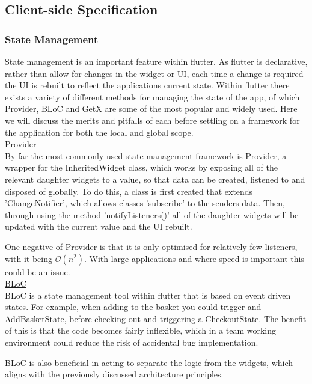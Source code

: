 \documentclass[12pt]{article}
\begin{document}
	

	
	\subsection{Client-side Specification}


	
	\subsubsection{State Management}
	State management is an important feature within flutter. As flutter is declarative, rather than allow for changes in the widget or UI, each time a change is required the UI is rebuilt to reflect the applications current state. Within flutter there exists a variety of different methods for managing the state of the app, of which Provider, BLoC and GetX are some of the most popular and widely used. Here we will discuss the merits and pitfalls of each before settling on a framework for the application for both the local and global scope.
	\\
	
	\noindent \underline{Provider}
	\\
	\noindent
	By far the most commonly used state management framework is Provider, a wrapper for the InheritedWidget class, which works by exposing all of the relevant daughter widgets to a value, so that data can be created, listened to and disposed of globally. To do this, a class is first created that extends 'ChangeNotifier', which allows classes 'subscribe' to the senders data. Then, through using the method 'notifyListeners()' all of the daughter widgets will be updated with the current value and the UI rebuilt.
	
	One negative of Provider is that it is only optimised for relatively few listeners, with it being $\mathcal{O}(n^2)$. With large applications and where speed is important this could be an issue.
	\\
	
	\noindent \underline{BLoC}
	\\
	BLoC is a state management tool within flutter that is based on event driven states. For example, when adding to the basket you could trigger and AddBasketState, before checking out and triggering a CheckoutState. The benefit of this is that the code becomes fairly inflexible, which in a team working environment could reduce the risk of accidental bug implementation.
	
	BLoC is also beneficial in acting to separate the logic from the widgets, which aligns with the previously discussed architecture principles.
	\\
	
\end{document}
